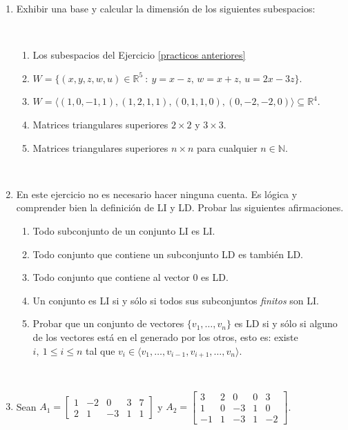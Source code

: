 \documentclass[12pt]{amsart}
\begin{document}
\begin{enumerate}
\

\item  Exhibir una base y calcular la dimensi\'on de los siguientes subespacios:

\

\begin{enumerate}
    \item Los subespacios del Ejercicio \eqref{practicos anteriores}
	\item $W = \{(x,y,z,w,u) \in \mathbb{R}^5 \ : \ y = x - z,\, w = x + z,\,  u = 2x - 3z \}$.
	\item $W = \langle (1, 0, -1, 1),  (1, 2, 1, 1), (0, 1, 1, 0), (0, -2, -2, 0) \rangle \subseteq \mathbb R^4$.
	\item Matrices triangulares superiores $2\times 2$ y $3\times 3$.
	\item Matrices triangulares superiores $n\times n$ para cualquier $n\in\mathbb{N}$.
\end{enumerate}

\

\item En este ejercicio no es necesario hacer ninguna cuenta. Es l\'ogica y comprender bien la definici\'on de LI y LD. Probar las siguientes afirmaciones. 
\begin{enumerate}
\item Todo subconjunto de un conjunto LI es LI.
\item Todo conjunto que contiene un subconjunto LD es tambi\'en LD.
\item Todo conjunto que contiene al vector 0 es LD.
\item Un conjunto es LI si y s\'olo si todos sus subconjuntos \emph{finitos} son LI.
\item Probar que un conjunto de vectores $\{v_1, \dots, v_n\}$ es LD si y s\'olo si alguno de los vectores est\'a en el generado por los otros, esto es:  existe $i,\ 1 \leq i \leq n$ tal que $v_i \in \langle v_1, \dots, v_{i-1}, v_{i+1}, \dots, v_n\rangle$.
\end{enumerate}

\

\item\label{matrices} Sean
	$
	A_1=\begin{bmatrix}
	1&-2&0&3&7\\
	2&1&-3&1&1
	\end{bmatrix}$ y $A_2=\begin{bmatrix}
	3&2&0&0&3\\
	1&0&-3&1&0 \\
	-1&1&-3&1&-2
	\end{bmatrix}
	$.
	

\end{enumerate}
\end{document}
